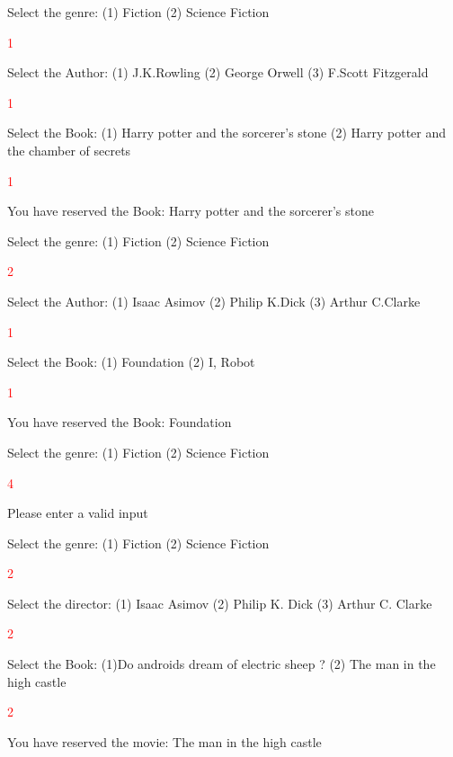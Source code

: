 \begin{sample}
Select the genre: (1) Fiction (2) Science Fiction

\textcolor{red}{1}

Select the Author: (1) J.K.Rowling (2) George Orwell (3) F.Scott Fitzgerald

\textcolor{red}{1}

Select the Book: (1)  Harry potter and the sorcerer's stone  (2) Harry potter and the chamber of secrets

\textcolor{red}{1}

You have reserved the Book: Harry potter and the sorcerer's stone
\end{sample}

\begin{sample}
Select the genre: (1) Fiction (2) Science Fiction

\textcolor{red}{2}

Select the Author: (1) Isaac Asimov (2) Philip K.Dick (3) Arthur C.Clarke

\textcolor{red}{1}

Select the Book: (1) Foundation (2) I, Robot

\textcolor{red}{1}

You have reserved the Book: Foundation

\end{sample}

\begin{sample}
Select the genre: (1) Fiction (2) Science Fiction

\textcolor{red}{4}

 Please enter a valid input
\end{sample}

\begin{sample}
Select the genre: (1) Fiction (2) Science Fiction

\textcolor{red}{2}

Select the director: (1) Isaac Asimov (2) Philip K. Dick (3) Arthur C. Clarke

\textcolor{red}{2}

Select the Book: (1)Do androids dream of electric sheep ?  (2) The man in the high castle

\textcolor{red}{2}

You have reserved the movie: The man in the high castle
\end{sample}












